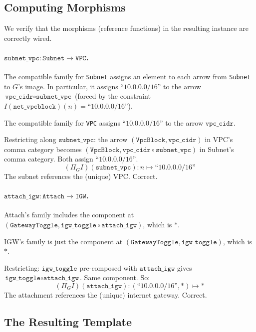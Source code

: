 \documentclass[11pt,a4paper]{article}
\theoremstyle{definition}
\theoremstyle{plain}
\begin{document}
\subsection{Computing Morphisms}

We verify that the morphisms (reference functions) in the resulting instance are correctly wired.

\paragraph{$\texttt{subnet\_vpc} \colon \texttt{Subnet} \to \texttt{VPC}$.}
The compatible family for \texttt{Subnet} assigns an element to each arrow from \texttt{Subnet} to $G$'s image. In particular, it assigns $\text{``10.0.0.0/16''}$ to the arrow $\texttt{vpc\_cidr} \circ \texttt{subnet\_vpc}$ (forced by the constraint $I(\texttt{net\_vpcblock})(n) = \text{``10.0.0.0/16''}$).

The compatible family for \texttt{VPC} assigns $\text{``10.0.0.0/16''}$ to the arrow $\texttt{vpc\_cidr}$.

Restricting along $\texttt{subnet\_vpc}$: the arrow $(\texttt{VpcBlock}, \texttt{vpc\_cidr})$ in VPC's comma category becomes $(\texttt{VpcBlock}, \texttt{vpc\_cidr} \circ \texttt{subnet\_vpc})$ in Subnet's comma category. Both assign $\text{``10.0.0.0/16''}$.
\[
(\Pi_G I)(\texttt{subnet\_vpc}) \colon n \mapsto \text{``10.0.0.0/16''}
\]
The subnet references the (unique) VPC. Correct.

\paragraph{$\texttt{attach\_igw} \colon \texttt{Attach} \to \texttt{IGW}$.}
Attach's family includes the component at $(\texttt{GatewayToggle}, \texttt{igw\_toggle} \circ \texttt{attach\_igw})$, which is $*$.

IGW's family is just the component at $(\texttt{GatewayToggle}, \texttt{igw\_toggle})$, which is $*$.

Restricting: $\texttt{igw\_toggle}$ pre-composed with $\texttt{attach\_igw}$ gives $\texttt{igw\_toggle} \circ \texttt{attach\_igw}$. Same component. So:
\[
(\Pi_G I)(\texttt{attach\_igw}) \colon (\text{``10.0.0.0/16''}, *) \mapsto *
\]
The attachment references the (unique) internet gateway. Correct.

\subsection{The Resulting Template}
\end{document}
